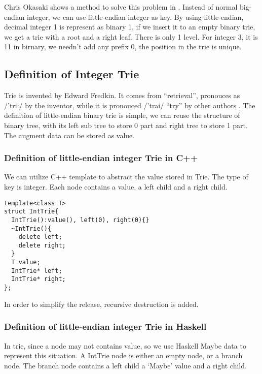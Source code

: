 \documentclass{article}
\begin{document}
Chris Okasaki shows a method to solve this problem in \cite{okasaki-int-map}. Instead of 
normal big-endian integer, we can use little-endian integer as key. By using little-endian,
decimal integer 1 is represent as binary 1, if we insert it to an empty binary trie, we
get a trie with a root and a right leaf. There is only 1 level. For integer 3, it is 11 in 
birnary, we needn't add any prefix 0, the position in the trie is unique.

\subsection{Definition of Integer Trie}
Trie is invented by Edward Fredkin. It comes from ``retrieval'', pronouces 
as /'tri:/ by the inventor, while it is pronouced /'trai/ ``try'' 
by other authors \cite{wiki-trie}.
The definition of little-endian binary trie is simple, we can reuse the structure
of binary tree, with its left sub tree to store 0 part and right tree to store 1 part.
The augment data can be stored as value.

\subsubsection*{Definition of little-endian integer Trie in C++}
We can utilize C++ template to abstract the value stored in Trie. The type
of key is integer. Each node contains a value, a left child and a right child.

\lstset{language=C++}
\begin{lstlisting}
template<class T>
struct IntTrie{
  IntTrie():value(), left(0), right(0){}
  ~IntTrie(){
    delete left;
    delete right;
  }
  T value;
  IntTrie* left;
  IntTrie* right;
};
\end{lstlisting}

In order to simplify the release, recursive destruction is added.

\subsubsection*{Definition of little-endian integer Trie in Haskell}
In trie, since a node may not contains value, so we use Haskell Maybe data to represent
this situation. A IntTrie node is either an empty node, or a branch node. The branch
node contains a left child a `Maybe' value and a right child. 
\end{document}
